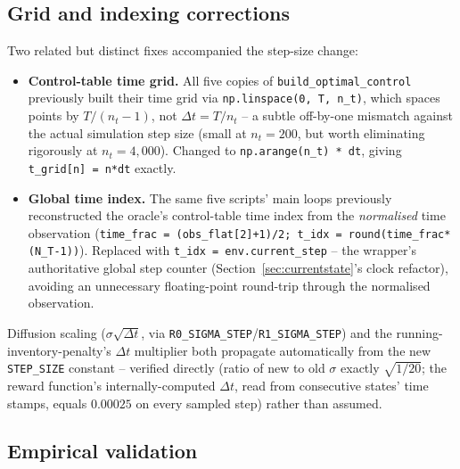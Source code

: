 \documentclass[11pt]{article}
\begin{document}
\subsection{Grid and indexing corrections}
Two related but distinct fixes accompanied the step-size change:
\begin{itemize}
\item \textbf{Control-table time grid.} All five copies of \texttt{build\_optimal\_control} previously built their time grid via \texttt{np.linspace(0, T, n\_t)}, which spaces points by $T/(n_t-1)$, not $\Delta t = T/n_t$ -- a subtle off-by-one mismatch against the actual simulation step size (small at $n_t=200$, but worth eliminating rigorously at $n_t=4{,}000$). Changed to \texttt{np.arange(n\_t) * dt}, giving \texttt{t\_grid[n] = n*dt} exactly.
\item \textbf{Global time index.} The same five scripts' main loops previously reconstructed the oracle's control-table time index from the \emph{normalised} time observation (\texttt{time\_frac = (obs\_flat[2]+1)/2; t\_idx = round(time\_frac*(N\_T-1))}). Replaced with \texttt{t\_idx = env.current\_step} -- the wrapper's authoritative global step counter (Section~\ref{sec:currentstate}'s clock refactor), avoiding an unnecessary floating-point round-trip through the normalised observation.
\end{itemize}
Diffusion scaling ($\sigma\sqrt{\Delta t}$, via \texttt{R0\_SIGMA\_STEP}/\texttt{R1\_SIGMA\_STEP}) and the running-inventory-penalty's $\Delta t$ multiplier both propagate automatically from the new \texttt{STEP\_SIZE} constant -- verified directly (ratio of new to old $\sigma$ exactly $\sqrt{1/20}$; the reward function's internally-computed $\Delta t$, read from consecutive states' time stamps, equals $0.00025$ on every sampled step) rather than assumed.

\subsection{Empirical validation}
\end{document}
